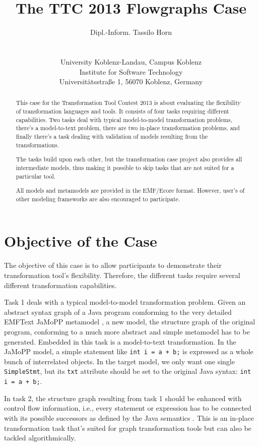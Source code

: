 \documentclass[10pt]{article}
\title{The TTC 2013 Flowgraphs Case}
\author{Dipl.-Inform. Tassilo Horn\\
  \myemail\\
  \vspace{0.3cm}\\
  University Koblenz-Landau, Campus Koblenz\\
  Institute for Software Technology\\
  Universitätsstraße 1, 56070 Koblenz, Germany}
\begin{document}
\maketitle

\begin{abstract}
  This case for the Transformation Tool Contest 2013 is about evaluating the
  flexibility of transformation languages and tools.  It consists of four tasks
  requiring different capabilities.  Two tasks deal with typical model-to-model
  transformation problems, there's a model-to-text problem, there are two
  in-place transformation problems, and finally there's a task dealing with
  validation of models resulting from the transformations.

  The tasks build upon each other, but the transformation case project also
  provides all intermediate models, thus making it possible to skip tasks that
  are not suited for a particular tool.

  All models and metamodels are provided in the EMF/Ecore format.  However,
  user's of other modeling frameworks are also encouraged to participate.
\end{abstract}

\sloppy

\section{Objective of the Case}
\label{sec:objective}

The objective of this case is to allow participants to demonstrate their
transformation tool's flexibility.  Therefore, the different tasks require
several different transformation capabilities.

Task 1 deals with a typical model-to-model transformation problem.  Given an
abstract syntax graph of a Java program comforming to the very detailed EMFText
JaMoPP metamodel \cite{jamopp09}, a new model, the structure graph of the
original program, conforming to a much more abstract and simple metamodel has
to be generated.  Embedded in this task is a model-to-text transformation.  In
the JaMoPP model, a simple statement like \verb|int i = a + b;| is expressed as
a whole bunch of interrelated objects.  In the target model, we only want one
single \verb|SimpleStmt|, but its \verb|txt| attribute should be set to the
original Java syntax: \verb|int i = a + b;|.

In task 2, the structure graph resulting from task 1 should be enhanced with
control flow information, i.e., every statement or expression has to be
connected with its possible successors as defined by the Java semantics
\cite{Java7Spec}.  This is an in-place transformation task that's suited for
graph transformation tools but can also be tackled algorithmically.
\end{document}
